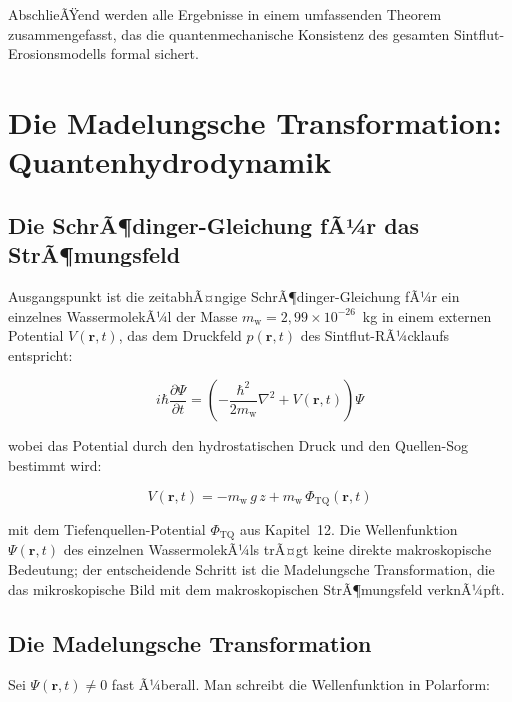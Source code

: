 ﻿\documentclass[12pt,a4paper]{report}
\begin{document}
AbschlieÃŸend werden alle Ergebnisse in einem umfassenden Theorem zusammengefasst, das die quantenmechanische Konsistenz des gesamten Sintflut-Erosionsmodells formal sichert.

\section{Die Madelungsche Transformation: Quantenhydrodynamik}
\label{sec:qhd}

\subsection{Die SchrÃ¶dinger-Gleichung fÃ¼r das StrÃ¶mungsfeld}

Ausgangspunkt ist die zeitabhÃ¤ngige SchrÃ¶dinger-Gleichung fÃ¼r ein einzelnes WassermolekÃ¼l der Masse $m_\mathrm{w} = 2{,}99 \times 10^{-26}$~kg in einem externen Potential $V(\mathbf{r},t)$, das dem Druckfeld $p(\mathbf{r},t)$ des Sintflut-RÃ¼cklaufs entspricht:

\begin{equation}
	i\hbar \frac{\partial \Psi}{\partial t} = \left(-\frac{\hbar^2}{2m_\mathrm{w}} \nabla^2 + V(\mathbf{r},t)\right)\Psi
	\label{eq:schroedinger_wasser}
\end{equation}

wobei das Potential durch den hydrostatischen Druck und den Quellen-Sog bestimmt wird:

\begin{equation}
	V(\mathbf{r},t) = -m_\mathrm{w}\,g\,z + m_\mathrm{w}\,\Phi_\mathrm{TQ}(\mathbf{r},t)
	\label{eq:potential_wasser}
\end{equation}

mit dem Tiefenquellen-Potential $\Phi_\mathrm{TQ}$ aus Kapitel~12. Die Wellenfunktion $\Psi(\mathbf{r},t)$ des einzelnen WassermolekÃ¼ls trÃ¤gt keine direkte makroskopische Bedeutung; der entscheidende Schritt ist die Madelungsche Transformation, die das mikroskopische Bild mit dem makroskopischen StrÃ¶mungsfeld verknÃ¼pft.

\subsection{Die Madelungsche Transformation}

Sei $\Psi(\mathbf{r},t) \neq 0$ fast Ã¼berall. Man schreibt die Wellenfunktion in Polarform:
\end{document}
